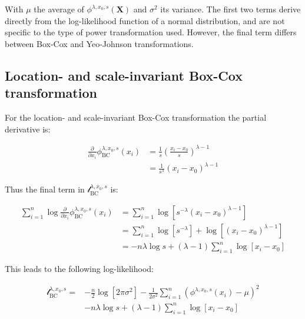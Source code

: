 \documentclass[
  a4paper,
]{article}
\begin{document}
With \(\mu\) the average of \(\phi^{\lambda, x_0, s}(\mathbf{X})\) and
\(\sigma^2\) its variance. The first two terms derive directly from the
log-likelihood function of a normal distribution, and are not specific
to the type of power transformation used. However, the final term
differs between Box-Cox and Yeo-Johnson transformations.

\subsection{Location- and scale-invariant Box-Cox
transformation}\label{location--and-scale-invariant-box-cox-transformation}

For the location- and scale-invariant Box-Cox transformation the partial
derivative is:

\begin{equation}
\begin{split}
\frac{\partial}{\partial x_i} \phi_{\text{BC}}^{\lambda, x_0, s}(x_i) & = \frac{1}{s} \left(\frac{x_i - x_0}{s} \right)^{\lambda-1} \\
 & = \frac{1} {s^\lambda} \left(x_i - x_0 \right)^{\lambda - 1}
\end{split}
\end{equation}

Thus the final term in \(\mathcal{l}_{\text{BC}}^{\lambda, x_0, s}\) is:

\begin{equation}
\begin{split}
\sum_{i=1}^n \log \frac{\partial}{\partial x_i} \phi_{\text{BC}}^{\lambda, x_0, s}(x_i) & = \sum_{i=1}^n \log \left[ s^{-\lambda} (x_i - x_0)^{\lambda - 1} \right] \\
& = \sum_{i=1}^n \log \left[s^{-\lambda} \right] + \log \left[ (x_i - x_0)^{\lambda - 1} \right]\\
& = -n \lambda \log s + \left( \lambda - 1 \right) \sum_{i=1}^n \log \left[ x_i - x_0 \right]
\end{split}
\end{equation}

This leads to the following log-likelihood:

\begin{equation}
\begin{split}
\mathcal{l}_{\text{BC}}^{\lambda, x_0, s} = & -\frac{n}{2} \log \left[2 \pi \sigma^2 \right] -\frac{1}{2 \sigma^2} \sum_{i=1}^n \left( \phi^{\lambda, x_0, s}(x_i) - \mu \right)^2 \\
& -n \lambda \log s + \left( \lambda - 1 \right) \sum_{i=1}^n \log \left[ x_i - x_0 \right]
\end{split}
\end{equation}
\end{document}
